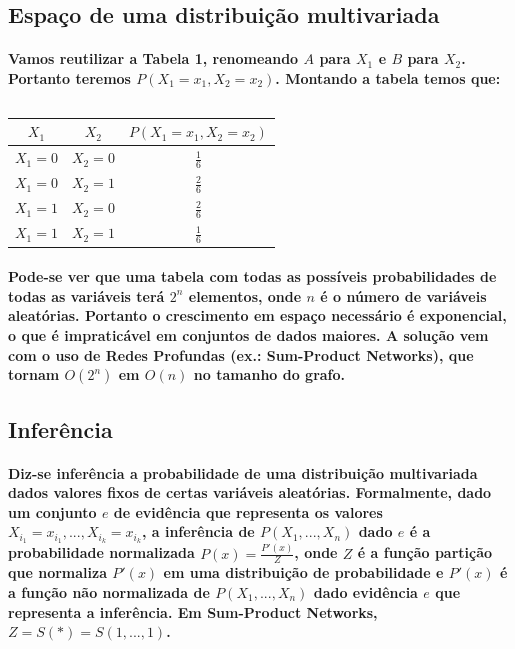 \documentclass[a4paper,10pt]{article}
\theoremstyle{plain}
\begin{document}
\subsection{Espaço de uma distribuição multivariada}

\paragraph{
  Vamos reutilizar a Tabela 1, renomeando $A$ para $X_1$ e $B$ para $X_2$. Portanto teremos $P(X_1=x_1,X_2=x_2)$. 
Montando a tabela temos que:
}

\begin{table}[h*]
\caption{}
\begin{tabular}{*{3}{c}}
$X_1$ & $X_2$ & $P(X_1=x_1,X_2=x_2)$ \\
\hline
$X_1=0$ & $X_2=0$ & $\frac{1}{6}$ \\
$X_1=0$ & $X_2=1$ & $\frac{2}{6}$ \\
$X_1=1$ & $X_2=0$ & $\frac{2}{6}$ \\
$X_1=1$ & $X_2=1$ & $\frac{1}{6}$ \\
\end{tabular}
\end{table}

\paragraph{
  Pode-se ver que uma tabela com todas as possíveis probabilidades de todas as variáveis terá $2^n$ elementos, 
onde $n$ é o número de variáveis aleatórias. Portanto o crescimento em espaço necessário é exponencial, o que
é impraticável em conjuntos de dados maiores. A solução vem com o uso de Redes Profundas (ex.: Sum-Product Networks), 
que tornam $O(2^n)$ em $O(n)$ no tamanho do grafo.
}

\subsection{Inferência}

\paragraph{
  Diz-se inferência a probabilidade de uma distribuição multivariada dados valores fixos de certas
variáveis aleatórias. Formalmente, dado um conjunto $e$ de evidência que representa os valores 
$X_{i_1}=x_{i_1},...,X_{i_k}=x_{i_k}$, a inferência de $P(X_1,...,X_n)$ dado $e$ é a probabilidade
normalizada $P(x)=\frac{P'(x)}{Z}$, onde $Z$ é a função partição que normaliza $P'(x)$ em uma 
distribuição de probabilidade e $P'(x)$ é a função não normalizada de $P(X_1,...,X_n)$ dado
evidência $e$ que representa a inferência. Em Sum-Product Networks, $Z=S(*)=S(1,...,1)$. 
}
\end{document}
